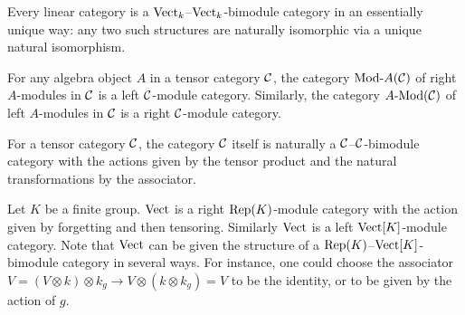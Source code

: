 \documentclass{amsart}
\begin{document}
\begin{example}
	Every linear category is a $\mathrm{Vect}_k$--$\mathrm{Vect}_k$-bimodule category in an essentially unique way: any two such structures are naturally isomorphic via a unique natural isomorphism.
\end{example}

\begin{example} \label{ex:ModulesAreModules}
	For any algebra object $A$ in a tensor category $\mathcal C$, the category $\Mod{}{A}(\cC)$ of right $A$-modules in $\mathcal C$ is a left $\mathcal C$-module category.  Similarly, the category $\Mod{A}{}(\cC)$ of left $A$-modules in $\mathcal C$ is a right $\mathcal C$-module category.
\end{example}

\begin{example}
For a tensor category $\mathcal C$, the category $\mathcal C$ itself is naturally a $\mathcal C$--$\mathcal C$-bimodule category with the actions given by the tensor product and the natural transformations by the associator.
\end{example}

\begin{example}
Let $K$ be a finite group. 
$\mathrm{Vect}$ is a right $\mathrm{Rep}(K)$-module category with the action given by forgetting and then tensoring.  Similarly $\mathrm{Vect}$ is a left $\mathrm{Vect}[K]$-module category.  Note that $\mathrm{Vect}$ can be given the structure of a $\mathrm{Rep}(K)$--$\mathrm{Vect}[K]$-bimodule category in several ways.  For instance, one could choose the associator $V = (V \otimes k) \otimes k_g \rightarrow V \otimes (k \otimes k_g) = V$ to be the identity, or to be given by the action of $g$.
\end{example}
\end{document}
